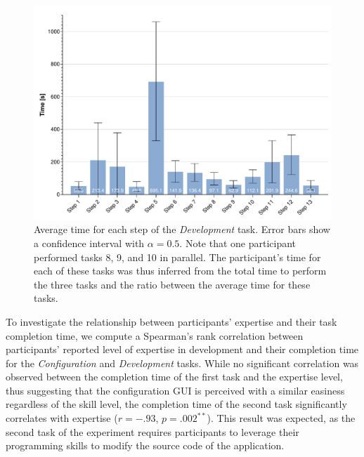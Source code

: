 \begin{figure}[ht]
    \centering
    \includegraphics[width=\linewidth]{Figures/QuantumLeap/Evaluation/Task 2 (time).pdf}
    \vspace{-18pt}
    \caption{Average time for each step of the \textit{Development} task. Error bars show a confidence interval with $\alpha{=}0.5$. Note that one participant performed tasks 8, 9, and 10 in parallel. The participant's time for each of these tasks was thus inferred from the total time to perform the three tasks and the ratio between the average time for these tasks.}
    \label{fig:quantumleap:task2-time}
\end{figure}

To investigate the relationship between participants' expertise and their task completion time, we compute a Spearman's rank correlation between participants' reported level of expertise in development and their completion time for the \textit{Configuration} and \textit{Development} tasks. While no significant correlation was observed between the completion time of the first task and the expertise level, thus suggesting that the configuration GUI is perceived with a similar easiness regardless of the skill level, the completion time of the second task significantly correlates with expertise ($r{=}-.93$, $p{=}.002^{**}$). This result was expected, as the second task of the experiment requires participants to leverage their programming skills to modify the source code of the application. 

